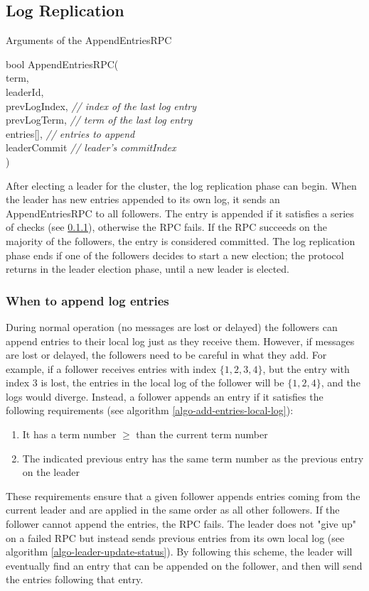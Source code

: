 \subsection{Log Replication}
\begin{algorithm}[ht]
\caption{Arguments of the AppendEntriesRPC}
\label{algo-appendEntries-arguments}
bool AppendEntriesRPC( \\
    term, \\
    leaderId, \\
    prevLogIndex, \emph{// index of the last log entry} \\
    prevLogTerm,  \emph{// term of the last log entry} \\
    entries[],    \emph{// entries to append} \\
    leaderCommit  \emph{// leader's commitIndex} \\
    )\;
\end{algorithm}
After electing a leader for the cluster, the log replication phase can begin. When the leader has new entries appended to its own log, it sends an AppendEntriesRPC to all followers. The entry is appended if it satisfies a series of checks (see \ref{when-to-append}), otherwise the RPC fails. If the RPC succeeds on the majority of the followers, the entry is considered committed. The log replication phase ends if one of the followers decides to start a new election; the protocol returns in the leader election phase, until a new leader is elected.
\subsubsection{When to append log entries}
\label{when-to-append}
During normal operation (no messages are lost or delayed) the followers can append entries to their local log just as they receive them. However, if messages are lost or delayed, the followers need to be careful in what they add. For example, if a follower receives entries with index $\{1,2,3,4\}$, but the entry with index 3 is lost, the entries in the local log of the follower will be $\{1,2,4\}$, and the logs would diverge. Instead, a follower appends an entry if it satisfies the following requirements (see algorithm \ref{algo-add-entries-local-log}):
\begin{enumerate}
    \item It has a term number $\geq$ than the current term number
    \item The indicated previous entry has the same term number as the previous entry on the leader 
\end{enumerate}
These requirements ensure that a given follower appends entries coming from the current leader and are applied in the same order as all other followers. If the follower cannot append the entries, the RPC fails. The leader does not "give up" on a failed RPC but instead sends previous entries from its own local log (see algorithm \ref{algo-leader-update-status}). By following this scheme, the leader will eventually find an entry that can be appended on the follower, and then will send the entries following that entry.


